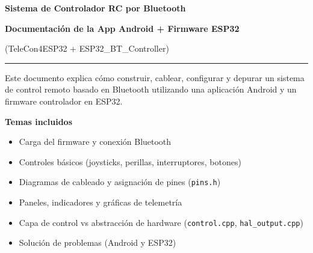 
    \begin{titlepage}
        \centering

        \vspace*{1.2cm}

        {\Huge\bfseries Sistema de Controlador RC por Bluetooth\par}
        \vspace{0.3cm}
        {\Large\bfseries Documentación de la App Android + Firmware ESP32\par}

        \vspace{0.8cm}
        {\large (TeleCon4ESP32 + ESP32\_BT\_Controller)\par}

        \vspace{1.2cm}
        \rule{0.9\textwidth}{0.8pt}\par
        \vspace{0.6cm}

        {\large
            Este documento explica cómo construir, cablear, configurar y depurar un sistema de
            control remoto basado en Bluetooth utilizando una aplicación Android y un firmware
            controlador en ESP32.
            \par}

        \vspace{0.9cm}

        \begin{minipage}{0.9\textwidth}
            \raggedright
            \textbf{Temas incluidos}
            \begin{itemize}
                \item Carga del firmware y conexión Bluetooth
                \item Controles básicos (joysticks, perillas, interruptores, botones)
                \item Diagramas de cableado y asignación de pines (\texttt{pins.h})
                \item Paneles, indicadores y gráficas de telemetría
                \item Capa de control vs abstracción de hardware (\texttt{control.cpp}, \texttt{hal\_output.cpp})
                \item Solución de problemas (Android y ESP32)
            \end{itemize}
        \end{minipage}


\end{titlepage}
